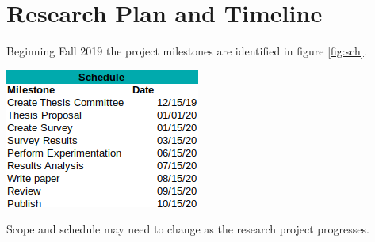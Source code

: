 \documentclass[conference]{IEEEtran}
\begin{document}
\section{Research Plan and Timeline}
Beginning Fall 2019 the project milestones are identified in figure \ref{fig:sch}.
\begin{center}
\includegraphics[width=\columnwidth]{schedule.png}
\label{fig:sch}%
\end{center}

Scope and schedule may need to change as the research project progresses.




\end{document}
